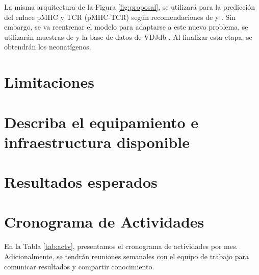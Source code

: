 \documentclass[a4paper,11pt]{article}
\begin{document}





La misma arquitectura de la Figura \ref{fig:proposal}, se utilizará para la predicción del enlace pMHC y TCR (pMHC-TCR) según recomendaciones de \cite{li2020progeo}  y \cite{myronov2023bertrand}. Sin embargo, se va reentrenar el modelo para adaptarse a este nuevo problema, se utilizarán muestras de \cite{li2020progeo} y la base de datos de VDJdb \citep{shugay2018vdjdb}. Al finalizar esta etapa, se obtendrán los neonatígenos.





\section{Limitaciones}



\section{Describa el equipamiento e infraestructura disponible}


\section{Resultados esperados}

\section{Cronograma de Actividades}
En la Tabla \ref{tab:actv}, presentamos el cronograma de actividades por mes. Adicionalmente, se tendrán reuniones semanales con el equipo de trabajo para comunicar resultados y compartir conocimiento.
\end{document}
